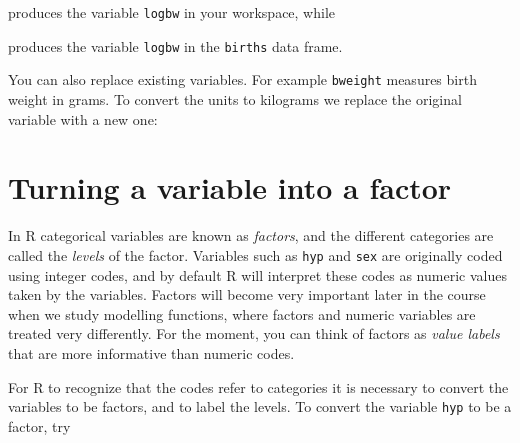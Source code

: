 \documentclass[
]{book}
\newenvironment{Shaded}{\begin{snugshade}}{\end{snugshade}}
\newcommand{\DecValTok}[1]{\textcolor[rgb]{0.00,0.00,0.81}{#1}}
\newcommand{\FunctionTok}[1]{\textcolor[rgb]{0.13,0.29,0.53}{\textbf{#1}}}
\newcommand{\NormalTok}[1]{#1}
\newcommand{\OtherTok}[1]{\textcolor[rgb]{0.56,0.35,0.01}{#1}}
\newcommand{\SpecialCharTok}[1]{\textcolor[rgb]{0.81,0.36,0.00}{\textbf{#1}}}
\theoremstyle{definition}
\theoremstyle{definition}
\theoremstyle{definition}
\theoremstyle{definition}
\theoremstyle{remark}
\begin{document}
\begin{Shaded}
\end{Shaded}

produces the variable \texttt{logbw} in your workspace, while

\begin{Shaded}
\end{Shaded}

produces the variable \texttt{logbw} in the \texttt{births} data frame.

You can also replace existing variables. For example \texttt{bweight} measures
birth weight in grams. To convert the units to kilograms we replace the
original variable with a new one:

\begin{Shaded}
\end{Shaded}

\section{Turning a variable into a factor}\label{turning-a-variable-into-a-factor}

In R categorical variables are known as \emph{factors}, and the
different categories are called the \emph{levels} of the factor.
Variables such as \texttt{hyp} and \texttt{sex} are originally coded using
integer codes, and by default R will interpret these codes as numeric
values taken by the variables. Factors will become very important
later in the course when we study modelling functions, where
factors and numeric variables are treated very differently. For the moment,
you can think of factors as \emph{value labels} that are more informative
than numeric codes.

For R to recognize that the codes refer to categories it is necessary
to convert the variables to be factors, and to label the levels. To
convert the variable \texttt{hyp} to be a factor, try
\end{document}
